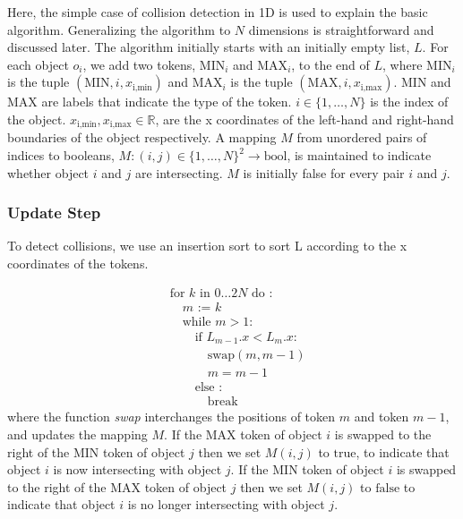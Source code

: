 \documentclass[11pt]{article} %
\begin{document}
Here, the simple case of collision detection in 1D is used to explain
the basic algorithm. Generalizing the algorithm to $N$ dimensions
is straightforward and discussed later. The algorithm initially starts
with an initially empty list, $L$. For each object $o_{i}$, we add
two tokens, $\text{MIN}_{i}$ and $\text{MAX}_{i}$, to the end of
$L$, where $\text{MIN}_{i}$ is the tuple $(\text{MIN},i,x_{\text{i},\text{min}})$
and $\text{MAX}_{i}$ is the tuple $(\text{MAX},i,x_{\text{i},\text{max}})$.
$\text{MIN}$ and $\text{MAX}$ are labels that indicate the type
of the token. $i\in\{1,\ldots,N\}$ is the index of the object. $x_{\text{i},\text{min}},x_{\text{i},\text{max}}\in\mathbb{R}$,
are the x coordinates of the left-hand and right-hand boundaries of
the object respectively. A mapping $M$
from unordered pairs of indices to booleans, $M:(i,j)\in\{1,\ldots,N\}^{2}\rightarrow\text{bool}$, is maintained to indicate whether object $i$ and $j$ are intersecting. $M$
is initially false for every pair $i$ and $j$.

\subsubsection{Update Step}

To detect collisions, we use an insertion sort to sort L according
to the x coordinates of the tokens. 

\[
\begin{aligned} & \text{for }k\text{ in }0\ldots2N\text{ do : }\\
 & \quad m\text{ := }k\\
 & \quad\text{while }m>1:\\
 & \quad\quad\text{if }L_{m-1}.x<L_{m}.x:\\
 & \quad\quad\quad\text{swap}(m,m-1)\\
 & \quad\quad\quad m=m-1\\
 & \quad\quad\text{else :}\\
 & \quad\quad\quad\text{break}
\end{aligned}
\]
where the function \emph{swap} interchanges the positions of token
$m$ and token $m-1$, and updates the mapping $M$. If the $\text{MAX}$
token of object $i$ is swapped to the right of the $\text{MIN}$
token of object $j$ then we set $M(i,j)$ to $\text{true}$, to indicate
that object $i$ is now intersecting with object $j$. If the $\text{MIN}$
token of object $i$ is swapped to the right of the $\text{MAX}$
token of object $j$ then we set $M(i,j)$ to $\text{false}$ to indicate
that object $i$ is no longer intersecting with object $j$. 
\end{document}
